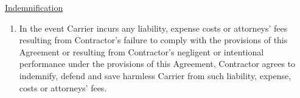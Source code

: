 \underline{Indemnification}
\begin{enumerate}[
    ref = \SecondLevelEnumerator
]
    \item In the event Carrier incurs any liability, expense costs or
    attorneys' fees resulting from Contractor's failure to comply with the
    provisions of this Agreement or resulting from Contractor's negligent
    or intentional performance under the provisions of this Agreement,
    Contractor agrees to indemnify, defend and save harmless Carrier from
    such liability, expense, costs or attorneys' fees.
\end{enumerate}